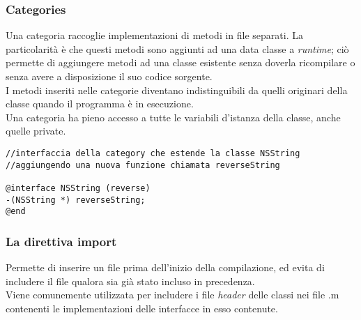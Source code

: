\subsubsection{Categories}
Una categoria raccoglie implementazioni di metodi in file separati. La particolarità è che questi metodi sono aggiunti ad una data classe a \textit{runtime}; ciò permette di aggiungere metodi ad una classe esistente senza doverla ricompilare o senza avere a disposizione il suo codice sorgente.\\I metodi inseriti nelle categorie diventano indistinguibili da quelli originari della classe quando il programma è in esecuzione.\\ Una categoria ha pieno accesso a tutte le variabili d'istanza della classe, anche quelle private. 
\lstset{language=[Objective]C, breakindent=40pt, breaklines}
\begin{lstlisting}
//interfaccia della category che estende la classe NSString
//aggiungendo una nuova funzione chiamata reverseString 

@interface NSString (reverse)
-(NSString *) reverseString;
@end
\end{lstlisting}
\subsubsection{La direttiva import}
Permette di inserire un file prima dell'inizio della compilazione, ed evita di includere il file qualora sia già stato incluso in precedenza.\\Viene comunemente utilizzata per includere i file \textit{header} delle classi nei file .m contenenti le implementazioni delle interfacce in esso contenute.
